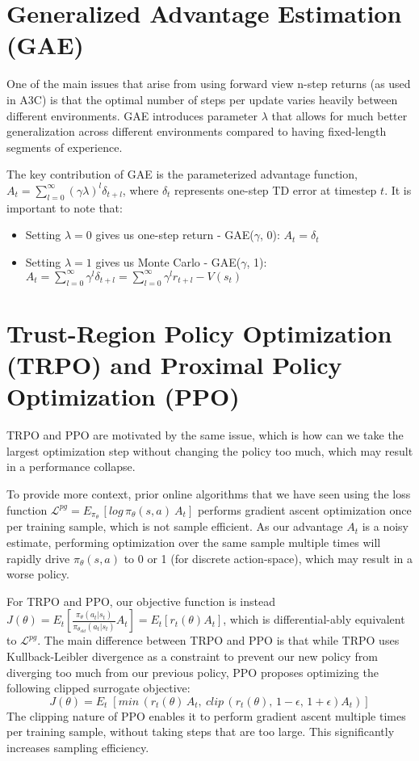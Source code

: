 \documentclass[11pt]{article} %
\begin{document}
\section{Generalized Advantage Estimation (GAE)}
One of the main issues that arise from using forward view n-step returns (as used in A3C) is that the optimal number of steps per update varies heavily between different environments. GAE \cite{gae} introduces parameter $\lambda$ that allows for much better generalization across different environments compared to having fixed-length segments of experience.

The key contribution of GAE is the parameterized advantage function, $A_t = \sum_{l=0}^\infty (\gamma \lambda)^l \delta_{t+l}$, where $\delta_t$ represents one-step TD error at timestep $t$. It is important to note that:
\begin{itemize}
    \item Setting $\lambda=0$ gives us one-step return - GAE($\gamma$, 0): $A_t = \delta_t$
    \item Setting $\lambda=1$ gives us Monte Carlo - GAE($\gamma$, 1): $A_t = \sum_{l=0}^\infty \gamma^l \delta_{t+l} = \sum_{l=0}^\infty \gamma^l r_{t+l} - V(s_t)$
\end{itemize}
\section{Trust-Region Policy Optimization (TRPO) and Proximal Policy Optimization (PPO)}
TRPO \cite{trpo} and PPO \cite{ppo} are motivated by the same issue, which is how can we take the largest optimization step without changing the policy too much, which may result in a performance collapse. 

To provide more context, prior online algorithms that we have seen using the loss function $\mathcal{L}^{pg} = E_{\pi_\theta}\,[log\,\pi_\theta(s,a)\: A_t]$ performs gradient ascent optimization once per training sample, which is not sample efficient. As our advantage $A_t$ is a noisy estimate, performing optimization over the same sample multiple times will rapidly drive $\pi_\theta(s,a)$ to 0 or 1 (for discrete action-space), which may result in a worse policy.

For TRPO and PPO, our objective function is instead $J(\theta) = E_t[\frac{\pi_\theta(a_t|s_t)}{\pi_{\theta_{old}}(a_t|s_t)}A_t] = E_t[r_t(\theta)A_t]$, which is differential-ably equivalent to $\mathcal{L}^{pg}$. The main difference between TRPO and PPO is that while TRPO uses Kullback-Leibler divergence as a constraint to prevent our new policy from diverging too much from our previous policy, PPO proposes optimizing the following clipped surrogate objective:
\begin{equation*}
    J(\theta) = E_t\;[min\,(r_t(\theta)\,A_t, \: clip\,(r_t(\theta),\, 1-\epsilon,\, 1+\epsilon)A_t)]
\end{equation*}
The clipping nature of PPO enables it to perform gradient ascent multiple times per training sample, without taking steps that are too large. This significantly increases sampling efficiency.
\end{document}
